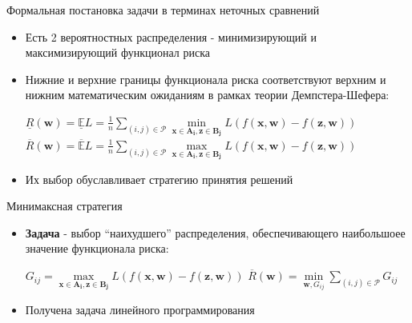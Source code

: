 \documentclass[11pt]{beamer}
\newcommand{\Rho}{%
	\mathcal{P}%
}
\begin{document}
\begin{frame}{Формальная постановка задачи в терминах неточных сравнений}

\begin{itemize}
	\item Есть 2 вероятностных распределения - минимизирующий и максимизирующий функционал риска
	\item Нижние и верхние границы функционала риска соответствуют верхним и нижним математическим ожиданиям в рамках теории Демпстера-Шефера:
	\begin{center}
		\(\underline{R}(\mathbf{w}) = \mathbb{\underline{E}}L = \frac{1}{n} \sum \limits_{(i,j) \in \Rho} \underset{\mathbf{x} \in \mathbf{A_i}, \mathbf{z} \in \mathbf{B_j}}{\operatorname{min}}L(f(\mathbf{x}, \mathbf{w}) - f(\mathbf{z}, \mathbf{w}))\) \linebreak
		\(\overline{R}(\mathbf{w}) = \mathbb{\overline{E}}L = \frac{1}{n} \sum \limits_{(i,j) \in \Rho} \underset{\mathbf{x} \in \mathbf{A_i}, \mathbf{z} \in \mathbf{B_j}}{\operatorname{max}}L(f(\mathbf{x}, \mathbf{w}) - f(\mathbf{z}, \mathbf{w}))\)
	\end{center} \linebreak
	\item Их выбор обуславливает стратегию принятия решений
\end{itemize}

\end{frame}
\begin{frame}{Минимаксная стратегия}

\begin{itemize}
	\item \textbf{Задача} - выбор ``наихудшего'' распределения, обеспечивающего наибольшоее значение функционала риска:
	\begin{center}
	\(G_{ij} = \underset{\mathbf{x} \in \mathbf{A_i}, \mathbf{z} \in \mathbf{B_j}}{\operatorname{max}} L (f (\mathbf{x}, \mathbf{w}) - f(\mathbf{z}, \mathbf{w}))\) \linebreak
	\(\overline{R}(\mathbf{w}) = \underset{\mathbf{w}, G_{ij}}{\operatorname{min}} \sum \limits_{(i, j) \in \Rho} G_{ij}\)
	\end{center}
	\item Получена задача линейного программирования
\end{itemize}

\end{frame}
\end{document}
